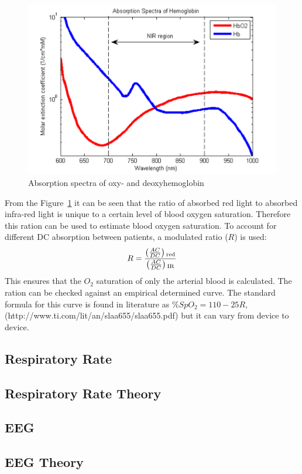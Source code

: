 \begin{figure}
   \centering
   \includegraphics[scale=0.8]{figs/AbsorptionSpectra}
   \caption{Absorption spectra of oxy- and deoxyhemoglobin}
   \label{fig:AbsorptionSpectra}
\end{figure}

From the Figure~\ref{fig:AbsorptionSpectra} it can be seen that the ratio of absorbed red light to absorbed infra-red light is unique to a certain level of blood oxygen saturation. Therefore this ration can be used to estimate blood oxygen saturation. To account for different DC absorption between patients, a modulated ratio ($R$) is used:
$$R = \frac{\left(\frac{AC}{DC}\right)\textsubscript{red}}{\left(\frac{AC}{DC}\right)\textsubscript{IR}} $$
This ensures that the $ O_2 $ saturation of only the arterial blood is calculated. The ration can be checked against an empirical determined curve. The standard formula for this curve is found in literature as $ \% SpO_2 = 110-25R $, (http://www.ti.com/lit/an/slaa655/slaa655.pdf) but it can vary from device to device. 

\subsection{Respiratory Rate}


\subsection{Respiratory Rate Theory}

\subsection{EEG}

\subsection{EEG Theory}

